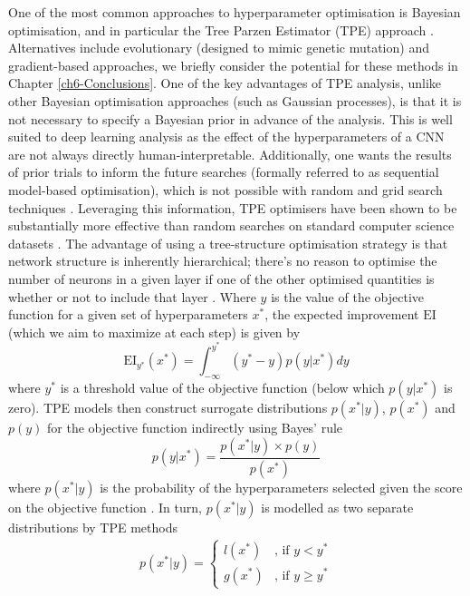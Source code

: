 One of the most common approaches to hyperparameter optimisation is Bayesian optimisation, and in particular the Tree Parzen Estimator (TPE) approach \cite{bergestra} \cite{tdshyper}. Alternatives include evolutionary (designed to mimic genetic mutation) and gradient-based approaches, we briefly consider the potential for these methods in Chapter \ref{ch6-Conclusions}. One of the key advantages of TPE analysis, unlike other Bayesian optimisation approaches (such as Gaussian processes), is that it is not necessary to specify a Bayesian prior in advance of the analysis. This is well suited to deep learning analysis as the effect of the hyperparameters of a CNN are not always directly human-interpretable. Additionally, one wants the results of prior trials to inform the future searches (formally referred to as sequential model-based optimisation), which is not possible with random and grid search techniques \cite{tdshyper}. Leveraging this information, TPE optimisers have been shown to be substantially more effective than random searches on standard computer science datasets \cite{bergestra}. The advantage of using a tree-structure optimisation strategy is that network structure is inherently hierarchical; there's no reason to optimise the number of neurons in a given layer if one of the other optimised quantities is whether or not to include that layer \cite{bergestra}. Where $y$ is the value of the objective function for a given set of hyperparameters $x^*$, the expected improvement $\textrm{EI}$ (which we aim to maximize at each step) is given by
\begin{equation}
    \textrm{EI}_{y^*}(x^*)=\int_{-\infty}^{y^*}(y^*-y)p(y|x^*)dy
\end{equation}
where $y^*$ is a threshold value of the objective function (below which $p(y|x^*)$ is zero). TPE models then construct surrogate distributions $p(x^*|y)$, $p(x^*)$ and $p(y)$ for the objective function indirectly using Bayes' rule
\begin{equation}
    p(y|x^*)=\frac{p(x^*|y) \times p(y)}{p(x^*)}
    \label{eq:surrogate}
\end{equation}
where $p(x^*|y)$ is the probability of the hyperparameters selected given the score on the objective function \cite{tdshyper}. In turn, $p(x^*|y)$ is modelled as two separate distributions by TPE methods
\begin{equation}
\begin{split}
    p(x^*|y) = \begin{cases} \textit{l}(x^*) & \mbox{, if }  y <y^* \\ \textit{g}(x^*) & \mbox{, if } y\geq y^* \end{cases}
\end{split}
\end{equation}
